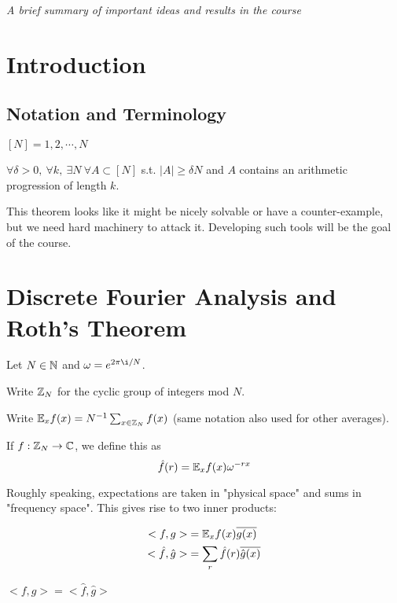 \documentclass[a4paper]{article}
\begin{document}
\maketitle
{\small \centering
\noindent\emph{A brief summary of important ideas and results in the course}

\section{Introduction}
\subsection{Notation and Terminology}
$[N] = {1,2,\cdots, N}$

\begin{thm}
	$\forall\delta > 0,\ \forall k,\ \exists N\ \forall A \subset [N]$ s.t. $|A| \geq\delta N$ and $A$ contains an arithmetic progression of length $k$.
\end{thm}

This theorem looks like it might be nicely solvable or have a counter-example, but we need hard machinery to attack it. Developing such tools will be the goal of the course.

\section{Discrete Fourier Analysis and Roth's Theorem}
Let $N\in\mathbb{N}$ and $\omega=e^{2\pi\i/N}$.

Write $\mathbb{Z}_N$ for the cyclic group of integers mod $N$.

Write $\mathbb{E}_xf(x)=N^{-1}\sum_{x\in\mathbb{Z}_N}f(x)$ (same notation also used for other averages).

\begin{defi}
	If $f:\mathbb{Z}_N \rightarrow \mathbb{C}$, we define this as
	$$\hat{f}(r) = \mathbb{E}_xf(x)\omega^{-rx}$$
\end{defi}

Roughly speaking, expectations are taken in "physical space" and sums in "frequency space". This gives rise to two inner products:

\begin{align*}
	<f,g> &= \mathbb{E}_xf(x)\overline{g(x)}\\
	<\hat{f},\hat{g}> &= \sum_{r} \hat{f}(r)\overline{\hat{g}(x)}
\end{align*}

\begin{fact}
	$<f,g> = <\hat{f},\hat{g}>$
\end{fact}

}
\end{document}
